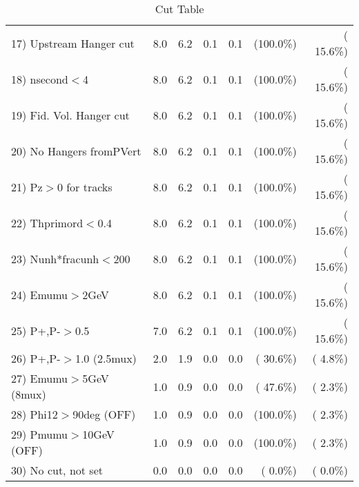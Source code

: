 \begin{table}[h!]
\begin{tabular}{||l||r|r|r|r|r|r||}
 17) Upstream Hanger cut  &          8.0 &          6.2 &          0.1 &          0.1 & (100.0\%) & ( 15.6\%) \\
 18) nsecond$<$4          &          8.0 &          6.2 &          0.1 &          0.1 & (100.0\%) & ( 15.6\%) \\
 19) Fid. Vol. Hanger cut &          8.0 &          6.2 &          0.1 &          0.1 & (100.0\%) & ( 15.6\%) \\
 20) No Hangers fromPVert &          8.0 &          6.2 &          0.1 &          0.1 & (100.0\%) & ( 15.6\%) \\
 21) Pz$>$0 for tracks    &          8.0 &          6.2 &          0.1 &          0.1 & (100.0\%) & ( 15.6\%) \\
 22) Thprimord$<$0.4      &          8.0 &          6.2 &          0.1 &          0.1 & (100.0\%) & ( 15.6\%) \\
 23) Nunh*fracunh$<$200   &          8.0 &          6.2 &          0.1 &          0.1 & (100.0\%) & ( 15.6\%) \\
 24) Emumu$>$2GeV         &          8.0 &          6.2 &          0.1 &          0.1 & (100.0\%) & ( 15.6\%) \\
 25) P+,P-$>$0.5          &          7.0 &          6.2 &          0.1 &          0.1 & (100.0\%) & ( 15.6\%) \\
 26) P+,P-$>$1.0 (2.5mux) &          2.0 &          1.9 &          0.0 &          0.0 & ( 30.6\%) & (  4.8\%) \\
 27) Emumu$>$5GeV  (8mux) &          1.0 &          0.9 &          0.0 &          0.0 & ( 47.6\%) & (  2.3\%) \\
 28) Phi12$>$90deg  (OFF) &          1.0 &          0.9 &          0.0 &          0.0 & (100.0\%) & (  2.3\%) \\
 29) Pmumu$>$10GeV  (OFF) &          1.0 &          0.9 &          0.0 &          0.0 & (100.0\%) & (  2.3\%) \\
 30) No cut, not set      &          0.0 &          0.0 &          0.0 &          0.0 & (  0.0\%) & (  0.0\%) \\
 \hline
 \hline
 \end{tabular}
 \caption{Cut Table           }
 \label{tab-cutheavy_neutrino_4.000}
 \end{table}
